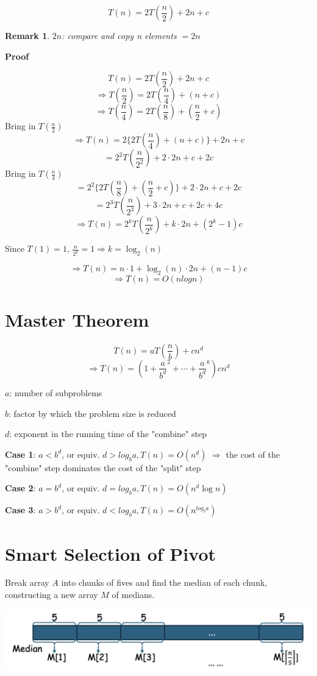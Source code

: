\documentclass[12pt,a4paper]{article}
\newtheorem*{rem}{Remark}
\newcommand{\Remark}[1]{
  \begin{rem}
    \color{cyan}
    #1
  \end{rem}
}
\begin{document}
\[T(n) = 2T(\frac{n}{2}) + 2n + c\]

\Remark{$2n$: compare and copy n elements $= 2n$}

\textbf{Proof}

\[T(n) = 2T(\frac{n}{2}) + 2n + c\]
\[\Rightarrow T(\frac{n}{2}) = 2T(\frac{n}{4}) + (n + c)\]
\[\Rightarrow T(\frac{n}{4}) = 2T(\frac{n}{8}) + (\frac{n}{2} + c)\] Bring in $T(\frac{n}{2})$
\[\Rightarrow T(n) = 2\{2T(\frac{n}{4}) + (n + c)\} + 2n + c\]
\[= 2^2T(\frac{n}{2^2}) + 2 \cdot 2n + c + 2c\] Bring in $T(\frac{n}{4})$
\[= 2^2\{2T(\frac{n}{8}) + (\frac{n}{2} + c)\} + 2 \cdot 2n + c + 2c\]
\[= 2^3T(\frac{n}{2^3}) + 3 \cdot 2n + c + 2c + 4c\]
\[\Rightarrow T(n)= 2^kT(\frac{n}{2^k}) + k \cdot 2n + (2^k-1)c\]

Since $T(1) = 1$, $\frac{n}{2^k} = 1 \Rightarrow k = \log_2(n)$

\[\Rightarrow T(n) = n \cdot 1 + \log_2(n) \cdot 2n + (n-1)c\]
\[\Rightarrow T(n) = O(nlogn) \]

\section*{Master Theorem}

\[T(n) = aT(\frac{n}{b}) + cn^d\]
\[\Rightarrow T(n) = (1 + \frac{a}{b^d}^2 + \cdots + \frac{a}{b^d}^k)cn^d\]

$a$: number of subproblems

$b$: factor by which the problem size is reduced

$d$: exponent in the running time of the "combine" step

\textbf{Case 1}: $a < b^d$, or equiv. $d > log_ba, T(n) = O(n^d)$
$\Rightarrow$ the cost of the "combine" step dominates the cost of the "split" step

\textbf{Case 2}: $a = b^d$, or equiv. $d = log_ba, T(n) = O(n^d \log n)$

\textbf{Case 3}: $a > b^d$, or equiv. $d < log_ba, T(n) = O(n^{log_ba})$

\section*{Smart Selection of Pivot}

Break array $A$ into chunks of fives and find the median of each chunk,
constructing a new array $M$ of medians.

\includegraphics[width=\textwidth]{./images/chunks_of_fives.png}
\end{document}
